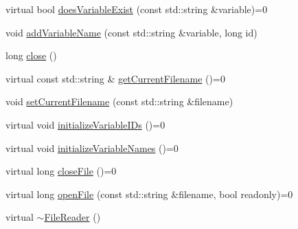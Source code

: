\begin{DoxyCompactItemize}
\item 
virtual bool \hyperlink{classccmc_1_1_file_reader_ab8893f7d2b0f62041c37a788affe6b36}{does\-Variable\-Exist} (const std\-::string \&variable)=0
\item 
void \hyperlink{classccmc_1_1_file_reader_ac1bdd1a91c75f4afdf5a77a7e6944494}{add\-Variable\-Name} (const std\-::string \&variable, long id)
\item 
long \hyperlink{classccmc_1_1_file_reader_a036ac2d85ad32a98b81c9e6ebf0ef133}{close} ()
\item 
virtual const std\-::string \& \hyperlink{classccmc_1_1_file_reader_a9f266e85464a71985e6c922ba508aa9e}{get\-Current\-Filename} ()=0
\item 
void \hyperlink{classccmc_1_1_file_reader_a61bb22d073119ba58b52a43c3d086fc8}{set\-Current\-Filename} (const std\-::string \&filename)
\item 
virtual void \hyperlink{classccmc_1_1_file_reader_a2663bad21fc69c24f555b27d1cc2b8c8}{initialize\-Variable\-I\-Ds} ()=0
\item 
virtual void \hyperlink{classccmc_1_1_file_reader_a3517b66817277210916f6e5aa3db21a8}{initialize\-Variable\-Names} ()=0
\item 
virtual long \hyperlink{classccmc_1_1_file_reader_aa9b2ff7591f3d3f40ceb0007acbbe3ca}{close\-File} ()=0
\item 
virtual long \hyperlink{classccmc_1_1_file_reader_ae4346cb5cf1c4861135d3f293d3da320}{open\-File} (const std\-::string \&filename, bool readonly)=0
\item 
virtual \hyperlink{classccmc_1_1_file_reader_a83d4e886090a2ef02d3fcc799fe2d349}{$\sim$\-File\-Reader} ()
\end{DoxyCompactItemize}
